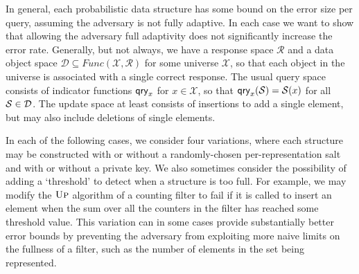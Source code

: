 In general, each probabilistic data structure has some bound on the error size per query, assuming the adversary is not fully adaptive. In each case we want to show that allowing the adversary full adaptivity does not significantly increase the error rate. Generally, but not always, we have a response space $\mathcal{R}$ and a data object space $\mathcal{D} \subseteq Func(\mathcal{X},\mathcal{R})$ for some universe $\mathcal{X}$, so that each object in the universe is associated with a single correct response. The usual query space consists of indicator functions $\mathsf{qry}_x$ for $x \in \mathcal{X}$, so that $\mathsf{qry}_x(\mathcal{S}) = \mathcal{S}(x)$ for all $\mathcal{S} \in \mathcal{D}$. The update space at least consists of insertions to add a single element, but may also include deletions of single elements.

In each of the following cases, we consider four variations, where each structure may be constructed with or without a randomly-chosen per-representation salt and with or without a private key. We also sometimes consider the possibility of adding a `threshold' to detect when a structure is too full. For example, we may modify the $\textsc{Up}$ algorithm of a counting filter to fail if it is called to insert an element when the sum over all the counters in the filter has reached some threshold value. This variation can in some cases provide substantially better error bounds by preventing the adversary from exploiting more naive limits on the fullness of a filter, such as the number of elements in the set being represented.

